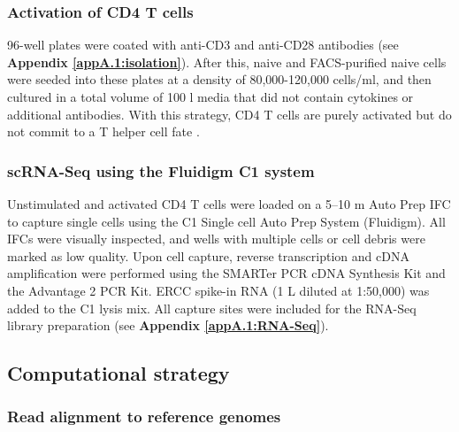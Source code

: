 \newpage

\subsubsection{Activation of CD4\plus{} T cells}

96-well plates were coated with anti-CD3\textepsilon{} and anti-CD28 antibodies (see \textbf{Appendix \ref{appA.1:isolation}}). After this, naive and FACS-purified naive cells were seeded into these plates at a density of 80,000-120,000 cells/ml, and then cultured in a total volume of 100 \textmu{}l media that did not contain cytokines or additional antibodies. With this strategy, CD4\plus{} T cells are purely activated but do not commit to a T helper cell fate \citep{Stubbington2015, Zhu2010}.

\subsubsection{scRNA-Seq using the Fluidigm C1 system}

Unstimulated and activated CD4\plus{} T cells were loaded on a 5–10 \textmu{}m Auto Prep IFC to capture single cells using the C1 Single cell Auto Prep System (Fluidigm). All IFCs were visually inspected, and wells with multiple cells or cell debris were marked as low quality. Upon cell capture, reverse transcription and cDNA amplification were performed using the SMARTer PCR cDNA Synthesis Kit and the Advantage 2 PCR Kit. ERCC spike-in RNA (1 \textmu{}L diluted at 1:50,000) was added to the C1 lysis mix. All capture sites were included for the RNA-Seq library preparation (see \textbf{Appendix \ref{appA.1:RNA-Seq}}).

\subsection{Computational strategy}
\label{sec1:computational}

\subsubsection{Read alignment to reference genomes}

